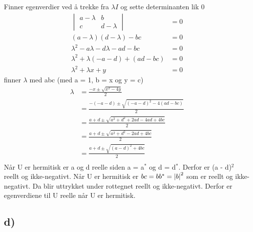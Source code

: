 \documentclass[norsk,a4paper,12pt]{article}
\begin{document}
		Finner egenverdier ved å trekke fra $\lambda I$ og sette determinanten lik 0
		\begin{equation}
		\begin{aligned}
		\begin{vmatrix} a - \lambda & b \\ c & d - \lambda \end{vmatrix} &= 0 \\
		(a - \lambda)(d - \lambda) - bc &= 0 \\
		\lambda^2 - a\lambda - d\lambda - ad - bc &= 0 \\
		\lambda^2 + \lambda(-a - d) + ( ad - bc) &= 0 \\
		\lambda^2 + \lambda x + y &= 0
		\end{aligned}
		\end{equation}
		finner $\lambda$ med abc (med a = 1, b = x og y = c)
		\begin{equation}
		\begin{aligned}
		\lambda &= \frac{-x \pm \sqrt{x^2 - 4y}}{2} \\
		&= \frac{-(-a - d) \pm \sqrt{(-a - d)^2 - 4( ad - bc)}}{2} \\
		&= \frac{a + d \pm \sqrt{a^2 + d^2 + 2ad - 4ad + 4bc}}{2} \\
		&= \frac{a + d \pm \sqrt{a^2 + d^2 - 2ad + 4bc}}{2} \\
		&= \frac{a + d \pm \sqrt{(a - d)^2 + 4bc}}{2} \\
		\end{aligned}
		\end{equation}
		Når U er hermitisk er a og d reelle siden a = a$^*$ og d = d$^*$. Derfor er (a - d)$^2$ reellt og ikke-negativt. Når U er hermitisk er $bc = bb^* = \abs{b}^2$ som er reellt og ikke-negativt. Da blir uttrykket under rottegnet reellt og ikke-negativt. Derfor er egenverdiene til U reelle når U er hermitisk.
		
	\subsection*{d)}
	
\end{document}
